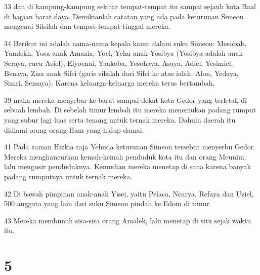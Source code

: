 \par 33 dan di kampung-kampung sekitar tempat-tempat itu sampai sejauh kota Baal di bagian barat daya. Demikianlah catatan yang ada pada keturunan Simeon mengenai Silsilah dan tempat-tempat tinggal mereka.
\par 34 Berikut ini adalah nama-nama kepala kaum dalam suku Simeon: Mesobab, Yamlekh, Yosa anak Amazia, Yoel, Yehu anak Yosibya (Yosibya adalah anak Seraya, cucu Asiel), Elyoenai, Yaakoba, Yesohaya, Asaya, Adiel, Yesimiel, Benaya, Ziza anak Sifei (garis silsilah dari Sifei ke atas ialah: Alon, Yedaya, Simri, Semaya). Karena keluarga-keluarga mereka terus bertambah,
\par 39 maka mereka menyebar ke barat sampai dekat kota Gedor yang terletak di sebuah lembah. Di sebelah timur lembah itu mereka menemukan padang rumput yang subur lagi luas serta tenang untuk ternak mereka. Dahulu daerah itu didiami orang-orang Ham yang hidup damai.
\par 41 Pada zaman Hizkia raja Yehuda keturunan Simeon tersebut menyerbu Gedor. Mereka menghancurkan kemah-kemah penduduk kota itu dan orang Meunim, lalu mengusir penduduknya. Kemudian mereka menetap di sana karena banyak padang rumputnya untuk ternak mereka.
\par 42 Di bawah pimpinan anak-anak Yisei, yaitu Pelaca, Nearya, Refaya dan Uziel, 500 anggota yang lain dari suku Simeon pindah ke Edom di timur.
\par 43 Mereka membunuh sisa-sisa orang Amalek, lalu menetap di situ sejak waktu itu.

\chapter{5}

